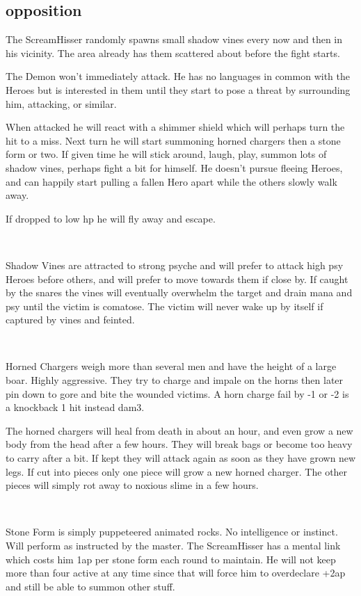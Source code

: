 \subsection*{opposition}
The ScreamHisser randomly spawns small shadow vines every now and then in his vicinity. The area already has them scattered about before the fight starts.

The Demon won't immediately attack. He has no languages in common with the Heroes but is interested in them until they start to pose a threat by surrounding him, attacking, or similar.

When attacked he will react with a shimmer shield which will perhaps turn the hit to a miss. Next turn he will start summoning horned chargers then a stone form or two. If given time he will stick around, laugh, play, summon lots of shadow vines, perhaps fight a bit for himself. He doesn't pursue fleeing Heroes, and can happily start pulling a fallen Hero apart while the others slowly walk away.

If dropped to low hp he will fly away and escape.

\

Shadow Vines are attracted to strong psyche and will prefer to attack high psy Heroes before others, and will prefer to move towards them if close by. If caught by the snares the vines will eventually overwhelm the target and drain mana and psy until the victim is comatose. The victim will never wake up by itself if captured by vines and feinted.

\

Horned Chargers weigh more than several men and have the height of a large boar. Highly aggressive. They try to charge and impale on the horns then later pin down to gore and bite the wounded victims. A horn charge fail by -1 or -2 is a knockback 1 hit instead dam3.

The horned chargers will heal from death in about an hour, and even grow a new body from the head after a few hours. They will break bags or become too heavy to carry after a bit. If kept they will attack again as soon as they have grown new legs. If cut into pieces only one piece will grow a new horned charger. The other pieces will simply rot away to noxious slime in a few hours.

\

Stone Form is simply puppeteered animated rocks. No intelligence or instinct. Will perform as instructed by the master. The ScreamHisser has a mental link which costs him 1ap per stone form each round to maintain. He will not keep more than four active at any time since that will force him to overdeclare +2ap and still be able to summon other stuff.


